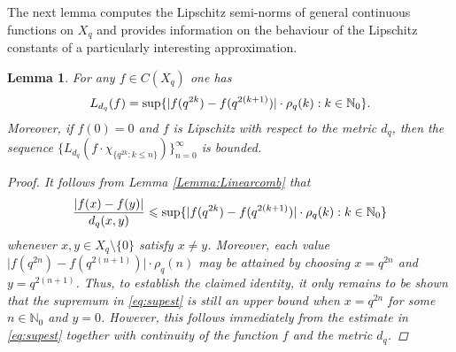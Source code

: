 \documentclass[11pt, reqno, a4paper, final]{amsart}
\newcounter{claim-counter}
\theoremstyle{plain}
\newtheorem{lemma}[thm]{Lemma}
\theoremstyle{definition}
\newcommand{\NN}{{\mathbb N}}
\renewcommand{\leq}{\leqslant}
\newcommand{\black}{\color{black}}
\begin{document}
The next lemma computes the Lipschitz {\black semi-norms} of general {\black continuous functions on $X_q$} and provides information on the behaviour of the Lipschitz constants of a particularly interesting approximation.
\begin{lemma}\label{Lemma:Subseq}
For any $f\in C(X_q)$ one has 
\[
L_{d_q}(f)=\sup \lbrace \vert f(q^{2k})-f(q^{2(k+1)})\vert \cdot \rho_q(k) : {\black k \in \NN_0} \rbrace.
\]
Moreover, {\black if $f(0) = 0$ and $f$ is Lipschitz with respect to the metric $d_q$}, then the sequence {\black $\big\{ L_{d_q}(f \cdot \chi_{\{q^{2k} : k\leq n\}}) \big\}_{n = 0}^\infty$} is bounded.
\begin{proof}

It follows from Lemma \ref{Lemma:Linearcomb} that 
\begin{equation}\label{eq:supest}
\frac{\vert f(x)-f(y) \vert }{d_q(x,y)}\leq 
\sup \lbrace \vert f(q^{2k}) -f(q^{2(k+1)}) \vert \cdot {\black \rho_q(k) : k \in \NN_0 } \rbrace
\end{equation}
whenever {\black $x,y \in X_q \setminus \{0\}$ satisfy $x \neq y$. Moreover,} each value $\vert f(q^{2n})- f(q^{2(n+1)}) \vert \cdot \rho_q(n)$ may be attained by choosing $x=q^{2n}$ and $y=q^{2(n+1)}$. Thus, {\black to establish the claimed identity}, it only remains to be shown that the supremum in \eqref{eq:supest} is still an upper bound when $x=q^{2n}$ for some $n\in \NN_0$ and $y=0$. {\black However, this follows immediately from the estimate in \eqref{eq:supest} together with continuity of the function $f$ and the metric $d_q$.}


\end{proof}
\end{lemma}
\end{document}
